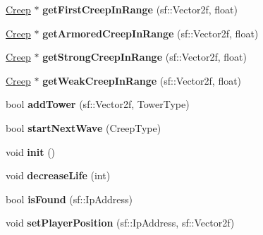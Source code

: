 \begin{DoxyCompactItemize}
\item 
\hypertarget{class_team_aeeba37ebf2b72529964bddfc9e92e815}{\hyperlink{class_creep}{Creep} $\ast$ {\bfseries get\+First\+Creep\+In\+Range} (sf\+::\+Vector2f, float)}\label{class_team_aeeba37ebf2b72529964bddfc9e92e815}

\item 
\hypertarget{class_team_ab49a30f4331b8e9e0455bdd3b0ddf8b8}{\hyperlink{class_creep}{Creep} $\ast$ {\bfseries get\+Armored\+Creep\+In\+Range} (sf\+::\+Vector2f, float)}\label{class_team_ab49a30f4331b8e9e0455bdd3b0ddf8b8}

\item 
\hypertarget{class_team_a4927c3a1f57fb5b8df5625ad4b05e381}{\hyperlink{class_creep}{Creep} $\ast$ {\bfseries get\+Strong\+Creep\+In\+Range} (sf\+::\+Vector2f, float)}\label{class_team_a4927c3a1f57fb5b8df5625ad4b05e381}

\item 
\hypertarget{class_team_a7ecec8ca1d67a4d2e2f408def10616bd}{\hyperlink{class_creep}{Creep} $\ast$ {\bfseries get\+Weak\+Creep\+In\+Range} (sf\+::\+Vector2f, float)}\label{class_team_a7ecec8ca1d67a4d2e2f408def10616bd}

\item 
\hypertarget{class_team_aae291f974d9c162558efbdf8adf808cf}{bool {\bfseries add\+Tower} (sf\+::\+Vector2f, Tower\+Type)}\label{class_team_aae291f974d9c162558efbdf8adf808cf}

\item 
\hypertarget{class_team_a1f91019f6c678a43a3a98831f117fb2b}{bool {\bfseries start\+Next\+Wave} (Creep\+Type)}\label{class_team_a1f91019f6c678a43a3a98831f117fb2b}

\item 
\hypertarget{class_team_aebbd9df59c50aaa40a1c4e0bacf36ef1}{void {\bfseries init} ()}\label{class_team_aebbd9df59c50aaa40a1c4e0bacf36ef1}

\item 
\hypertarget{class_team_ad52cb4c3aef31e43ca4eba7d203755f6}{void {\bfseries decrease\+Life} (int)}\label{class_team_ad52cb4c3aef31e43ca4eba7d203755f6}

\item 
\hypertarget{class_team_ac46d3ae4adb8fa75c984bd23015d6345}{bool {\bfseries is\+Found} (sf\+::\+Ip\+Address)}\label{class_team_ac46d3ae4adb8fa75c984bd23015d6345}

\item 
\hypertarget{class_team_aae0aabdd285c851af0c2b72f1ef0e4b1}{void {\bfseries set\+Player\+Position} (sf\+::\+Ip\+Address, sf\+::\+Vector2f)}\label{class_team_aae0aabdd285c851af0c2b72f1ef0e4b1}


\end{DoxyCompactItemize}
